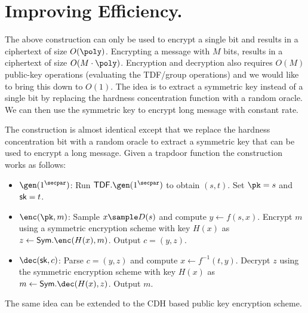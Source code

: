 \section{Improving Efficiency.}
The above construction can only be used to encrypt a single bit and results in a ciphertext of size $O(\poly)$. Encrypting a message with $M$ bits, results in a ciphertext of size $O(M \cdot \poly)$. Encryption and decryption also requires $O(M)$ public-key operations (evaluating the TDF/group operations) and we would like to bring this down to $O(1)$. The idea is to extract a symmetric key instead of a single bit by replacing the hardness concentration function with a random oracle. We can then use the symmetric key to encrypt long message with constant rate.

The construction is almost identical except that we replace the hardness concentration bit with a random oracle to extract a symmetric key that can be used to encrypt a long message. Given a trapdoor function the construction works as follows:
\begin{itemize}
    \item $\gen(1^\secpar)$: Run $\mathsf{TDF}.\gen(1^\secpar)$ to obtain $(s,t)$. Set $\pk = s$ and $\mathsf{sk} = t$.
    \item $\enc(\pk, m)$: Sample $x \sample D(s)$ and compute $y \gets f(s, x)$. Encrypt $m$ using a symmetric encryption scheme with key $H(x)$ as $z \gets \mathsf{Sym}.\enc(H(x), m)$. Output $c = (y, z)$.
    \item $\dec(\sk, c)$: Parse $c = (y, z)$ and compute $x \gets f^{-1}(t, y)$. Decrypt $z$ using the symmetric encryption scheme with key $H(x)$ as $m \gets \mathsf{Sym}.\dec(H(x), z)$. Output $m$.
\end{itemize}
The same idea can be extended to the CDH based public key encryption scheme.

